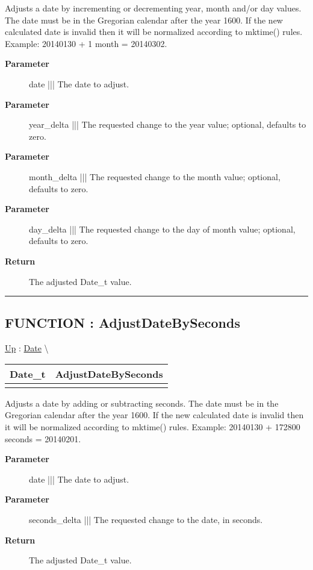 \par
Adjusts a date by incrementing or decrementing year, month and/or day values. The date must be in the Gregorian calendar after the year 1600. If the new calculated date is invalid then it will be normalized according to mktime() rules. Example: 20140130 + 1 month = 20140302.

\par
\begin{description}
\item [\textbf{Parameter}] date ||| The date to adjust.
\item [\textbf{Parameter}] year\_delta ||| The requested change to the year value; optional, defaults to zero.
\item [\textbf{Parameter}] month\_delta ||| The requested change to the month value; optional, defaults to zero.
\item [\textbf{Parameter}] day\_delta ||| The requested change to the day of month value; optional, defaults to zero.
\item [\textbf{Return}] The adjusted Date\_t value.
\end{description}

\rule{\linewidth}{0.5pt}
\subsection*{FUNCTION : AdjustDateBySeconds}
\hypertarget{ecldoc:date.adjustdatebyseconds}{}
\hyperlink{ecldoc:Date}{Up} :
\hspace{0pt} \hyperlink{ecldoc:Date}{Date} \textbackslash 

{\renewcommand{\arraystretch}{1.5}
\begin{tabularx}{\textwidth}{|>{\raggedright\arraybackslash}l|X|}
\hline
\hspace{0pt}Date\_t & AdjustDateBySeconds \\
\hline
\multicolumn{2}{|>{\raggedright\arraybackslash}X|}{\hspace{0pt}(Date\_t date, INTEGER4 seconds\_delta)} \\
\hline
\end{tabularx}
}

\par
Adjusts a date by adding or subtracting seconds. The date must be in the Gregorian calendar after the year 1600. If the new calculated date is invalid then it will be normalized according to mktime() rules. Example: 20140130 + 172800 seconds = 20140201.

\par
\begin{description}
\item [\textbf{Parameter}] date ||| The date to adjust.
\item [\textbf{Parameter}] seconds\_delta ||| The requested change to the date, in seconds.
\item [\textbf{Return}] The adjusted Date\_t value.
\end{description}

